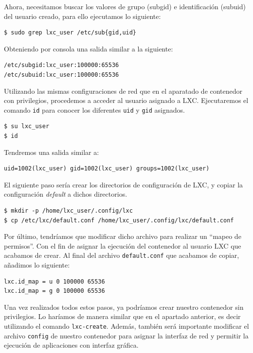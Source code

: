 \documentclass[a4paper, oneside, 12pt]{book}
\begin{document}
	\noindent Ahora, necesitamos buscar los valores de grupo (subgid) e identificación (subuid) del usuario creado, para ello ejecutamos lo siguiente:
	\begin{verbatim}
$ sudo grep lxc_user /etc/sub{gid,uid}
	\end{verbatim}

	\noindent Obteniendo por consola una salida similar a la siguiente:
	\begin{verbatim}
/etc/subgid:lxc_user:100000:65536
/etc/subuid:lxc_user:100000:65536
	\end{verbatim}

	\pagebreak
	
	\noindent Utilizando las mismas configuraciones de red que en el aparatado de contenedor con privilegios, procedemos a acceder al usuario asignado a LXC. Ejecutaremos el comando \texttt{id} para conocer los diferentes \texttt{uid} y \texttt{gid} asignados.
	\begin{verbatim}
$ su lxc_user
$ id
	\end{verbatim}

	\noindent Tendremos una salida similar a:
	\begin{verbatim}
uid=1002(lxc_user) gid=1002(lxc_user) groups=1002(lxc_user)
	\end{verbatim}

	\noindent El siguiente paso sería crear los directorios de configuración de LXC, y copiar la configuración \textit{default} a dichos directorios.
	\begin{verbatim}
$ mkdir -p /home/lxc_user/.config/lxc
$ cp /etc/lxc/default.conf /home/lxc_user/.config/lxc/default.conf
	\end{verbatim}

	\noindent Por último, tendríamos que modificar dicho archivo para realizar un ``mapeo de permisos''. Con el fin de asignar la ejecución del contenedor al usuario LXC que acabamos de crear. Al final del archivo \texttt{default.conf} que acabamos de copiar, añadimos lo siguiente:
	\begin{lstlisting}[language=Bash, caption={Configuración para mapear UID y GID para un contenedor sin privilegios en LXC}]
lxc.id_map = u 0 100000 65536
lxc.id_map = g 0 100000 65536
	\end{lstlisting}

	\noindent Una vez realizados todos estos pasos, ya podríamos crear nuestro contenedor sin privilegios. Lo haríamos de manera similar que en el apartado anterior, es decir utilizando el comando \texttt{lxc-create}. Además, también será importante modificar el archivo \texttt{config} de nuestro contenedor para asignar la interfaz de red y permitir la ejecución de aplicaciones con interfaz gráfica. \\
	
\end{document}
